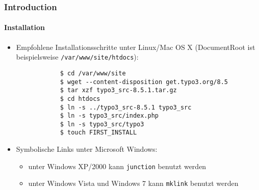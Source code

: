 \begin{frame}[fragile]
	\frametitle{Introduction}
	\framesubtitle{Installation}

	\begin{itemize}
		\item Empfohlene Installationsschritte unter Linux/Mac OS X\newline
			(DocumentRoot ist beispielsweise \texttt{/var/www/site/htdocs}):
		\begin{lstlisting}
			$ cd /var/www/site
			$ wget --content-disposition get.typo3.org/8.5
			$ tar xzf typo3_src-8.5.1.tar.gz
			$ cd htdocs
			$ ln -s ../typo3_src-8.5.1 typo3_src
			$ ln -s typo3_src/index.php
			$ ln -s typo3_src/typo3
			$ touch FIRST_INSTALL
		\end{lstlisting}

		\item Symbolische Links unter Microsoft Windows:

			\begin{itemize}
				\item unter Windows XP/2000 kann \texttt{junction} benutzt werden
				\item unter Windows Vista und Windows 7 kann \texttt{mklink} benutzt werden
			\end{itemize}

	\end{itemize}
\end{frame}


